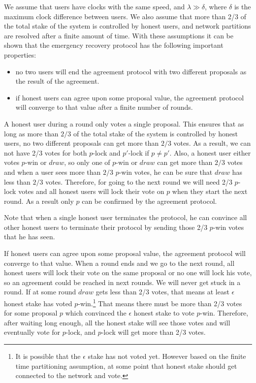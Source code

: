 We assume that users have clocks with the same speed, and $\lambda \gg \delta$, where $\delta$ is the maximum
clock difference between users. We also assume that more than 2/3 of the total stake of the system is controlled
by honest users, and network partitions are resolved after a finite amount of time. With these assumptions it can be
shown that the emergency recovery protocol has the following important properties:
\begin{itemize}
    \item no two users will end the agreement protocol with two different proposals as the result of the agreement.
    \item if honest users can agree upon some proposal value, the agreement protocol will converge to that value
    after a finite number of rounds.
\end{itemize}

A honest user during a round only votes a single proposal. This ensures that as long as more than $2/3$ of the total
stake of the system is controlled by honest users, no two different proposals can get more than $2/3$ votes.
As a result, we can not have 2/3 votes for both $p$-lock and $p'$-lock if $p \neq p'$. Also, a honest user
either votes $p$-win or $draw$, so only one of $p$-win or $draw$ can get more than $2/3$ votes and when a
user sees more than $2/3$ $p$-win votes, he can be sure that $draw$ has less than $2/3$ votes. Therefore, for going
to the next round we will need 2/3 $p$-lock
votes and all honest users will lock their vote on $p$ when they start the next round. As a result only $p$ can be
confirmed by the agreement protocol.

Note that when a single honest user terminates the protocol, he can convince all other honest users to terminate
their protocol by sending those 2/3 $p$-win votes that he has seen.

If honest users can agree upon some proposal value, the agreement protocol will converge to that value. When a round
ends and we go to the next round, all honest users will lock their vote on
the same proposal or no one will lock his vote, so an agreement could be reached in next rounds. We will never get
stuck in a round. If at some
round $draw$ gets less than 2/3 votes, that means at least $\epsilon$ honest stake has voted
$p$-win.\footnote{It is possible that the $\epsilon$ stake has not voted yet. However based on the finite time
partitioning assumption, at some point that honest stake should get connected to the network and vote.}
That means there must be more than 2/3 votes for some proposal $p$ which convinced the $\epsilon$ honest stake to
vote $p$-win. Therefore, after waiting long enough, all the honest stake will see those votes and will eventually
vote for $p$-lock, and $p$-lock will get more than 2/3 votes.

